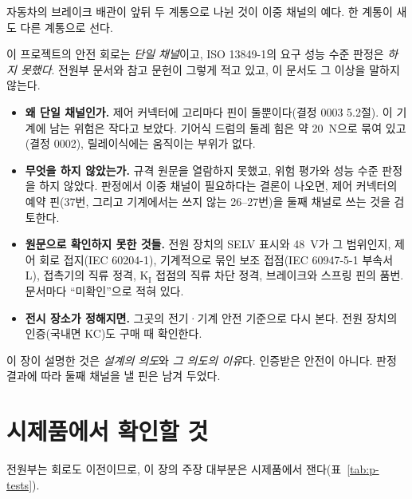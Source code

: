 \General 자동차의 브레이크 배관이 앞뒤 두 계통으로 나뉜 것이 이중 채널의 예다. 한 계통이 새도 다른 계통으로 선다.

\Ours 이 프로젝트의 안전 회로는 \emph{단일 채널}이고, ISO 13849-1의 요구 성능 수준 판정은 \emph{하지 못했다}. 전원부 문서와 참고 문헌이
그렇게 적고 있고, 이 문서도 그 이상을 말하지 않는다.
\begin{itemize}
\item \textbf{왜 단일 채널인가.} 제어 커넥터에 고리마다 핀이 둘뿐이다(결정 0003 5.2절). 이 기계에 남는 위험은 작다고 보았다. 기어식 드럼의
둘레 힘은 약 20~N으로 묶여 있고(결정 0002), 릴레이식에는 움직이는 부위가 없다.
\item \textbf{무엇을 하지 않았는가.} 규격 원문을 열람하지 못했고, 위험 평가와 성능 수준 판정을 하지 않았다. 판정에서 이중 채널이 필요하다는
결론이 나오면, 제어 커넥터의 예약 핀(37번, 그리고 기계에서는 쓰지 않는 26--27번)을 둘째 채널로 쓰는 것을 검토한다.
\item \textbf{원문으로 확인하지 못한 것들.} 전원 장치의 SELV 표시와 48~V가 그 범위인지, 제어 회로 접지(IEC 60204-1), 기계적으로 묶인 보조
접점(IEC 60947-5-1 부속서 L), 접촉기의 직류 정격, K$_\mathrm{I}$ 접점의 직류 차단 정격, 브레이크와 스프링 핀의 품번. 문서마다
``미확인''으로 적혀 있다.
\item \textbf{전시 장소가 정해지면.} 그곳의 전기·기계 안전 기준으로 다시 본다. 전원 장치의 인증(국내면 KC)도 구매 때 확인한다.
\end{itemize}
이 장이 설명한 것은 \emph{설계의 의도}와 \emph{그 의도의 이유}다. 인증받은 안전이 아니다. 판정 결과에 따라 둘째 채널을 낼 핀은 남겨 두었다.

\section{시제품에서 확인할 것}\label{sec:p-tests}

전원부는 회로도 이전이므로, 이 장의 주장 대부분은 시제품에서 잰다(표~\ref{tab:p-tests}).

